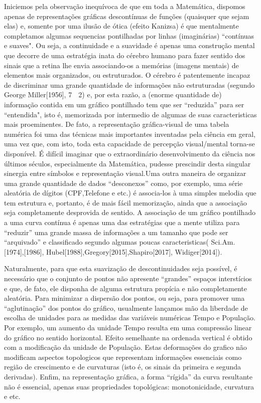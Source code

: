 {    Iniciemos pela observação inequívoca de que em toda a Matemática, dispomos apenas de representações gráficas descontínuas de funções (quaisquer que sejam elas) e, somente por uma ilusão de ótica (efeito Kanizsa) é que mentalmente completamos algumas sequencias pontilhadas por linhas (imaginárias) ``contínuas e suaves". Ou seja, a continuidade e a suavidade é apenas uma construção mental que decorre de uma estratégia inata do cérebro humano para fazer sentido dos sinais que a retina lhe envia associando-os a memórias (imagens mentais) de elementos mais organizados, ou estruturados. O cérebro é patentemente incapaz de discriminar uma grande quantidade de informações não estruturadas (segundo George Miller[1956], 7  2) e, por esta razão, a (enorme quantidade de) informação contida em um gráfico pontilhado tem que ser ``reduzida'' para ser ``entendida", isto é, memorizada por intermedio de algumas de suas caracteristicas mais proeminentes. De fato, a representação gráfica-visual de uma tabela numérica foi uma das técnicas mais importantes inventadas pela ciência em geral, uma vez que, com isto, toda esta capacidade de percepção visual/mental torna-se disponível. É difícil imaginar que o extraordinário desenvolvimento da ciência nos últimos séculos, especialmente da Matemática, pudesse prescindir desta singular sinergia entre símbolos e representação visual.Uma outra maneira de organizar uma grande quantidade de dados ``desconexos'' como, por exemplo, uma série aleatória de dígitos (CPF,Telefone e etc.) é associa-los à uma simples melodia que tem estrutura e, portanto, é de mais fácil memorização, ainda que a associação seja completamente desprovida de sentido. A associação de um gráfico pontilhado a uma curva contínua é apenas uma das estratégias que a mente utiliza para ``reduzir'' uma grande massa de informações a um tamanho que pode ser ``arquivado'' e classificado segundo algumas poucas caracteristicas( Sci.Am. [1974],[1986], Hubel[1988],Gregory[2015],Shapiro[2017], Widiger[2014]).

    Naturalmente, para que esta suavização de descontinuidades seja possível, é necessário que o conjunto de pontos não apresente ``grandes'' espaços interstícios e que, de fato, ele disponha de alguma estrutura propícia e não completamente aleatória. Para minimizar a dispersão dos pontos, ou seja, para promover uma ``aglutinação'' dos pontos do gráfico, usualmente lançamos mão da liberdade de escolha de unidades para as medidas das variáveis numéricas Tempo e População. Por exemplo, um aumento da unidade Tempo resulta em uma compressão linear do gráfico no sentido horizontal. Efeito semelhante na ordenada vertical é obtido com a modificação da unidade de População. Estas deformações do grafico não modificam aspectos topologicos que representam informações essenciais como região de crescimento e de curvaturas (isto é, os sinais da primeira e segunda derivadas). Enfim, na representação gráfica, a forma ``rígida'' da curva resultante não é essencial, apenas suas propriedades topológicas: monotonicidade, curvatura e etc.

}
